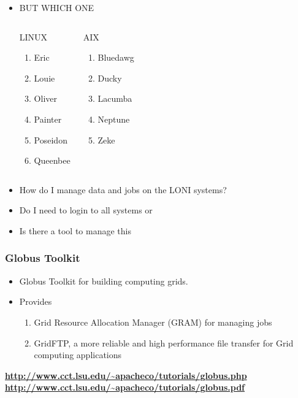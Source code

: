 \documentclass[slidestop,mathserif,compress,xcolor=svgnames]{beamer}
\begin{document}
\begin{frame}
\begin{itemize}
\item BUT WHICH ONE

\begin{columns}
\column{4cm}
\begin{block}{LINUX}
\begin{enumerate}
\item Eric
\item Louie
\item Oliver
\item Painter
\item Poseidon
\item Queenbee
\end{enumerate}
\end{block}
\column{4cm}
\begin{block}{AIX}
\begin{enumerate}
\item Bluedawg
\item Ducky
\item Lacumba
\item Neptune
\item Zeke
\end{enumerate}
\end{block}
\end{columns}
\item How do I manage data and jobs on the LONI systems?
\item Do I need to login to all systems or
\item Is there a tool to manage this
\end{itemize}
\end{frame}

\begin{frame}[fragile]
\frametitle{{\small Globus Toolkit}}
\begin{block}{}
\begin{itemize}
\item Globus Toolkit for building computing grids.
\item Provides 
\begin{enumerate}
\item Grid Resource Allocation Manager (GRAM) for managing jobs
\item GridFTP, a more reliable and high performance file transfer for Grid computing applications
\end{enumerate}
\end{itemize}
\end{block}

\begin{exampleblock}{}
\footnotesize{\bf
\url{http://www.cct.lsu.edu/~apacheco/tutorials/globus.php}\\
\url{http://www.cct.lsu.edu/~apacheco/tutorials/globus.pdf}}
\end{exampleblock}
\end{frame}
\end{document}

